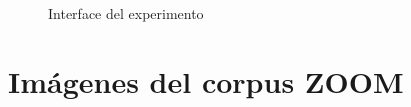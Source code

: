 \begin{figure}[ht]
\begin{center}
\\[0pt]
\caption{Interface del experimento}
\label{fig-interface}
\end{center}
\end{figure}


\chapter{Im\'agenes del corpus ZOOM}
\label{imagenes-zoom}


